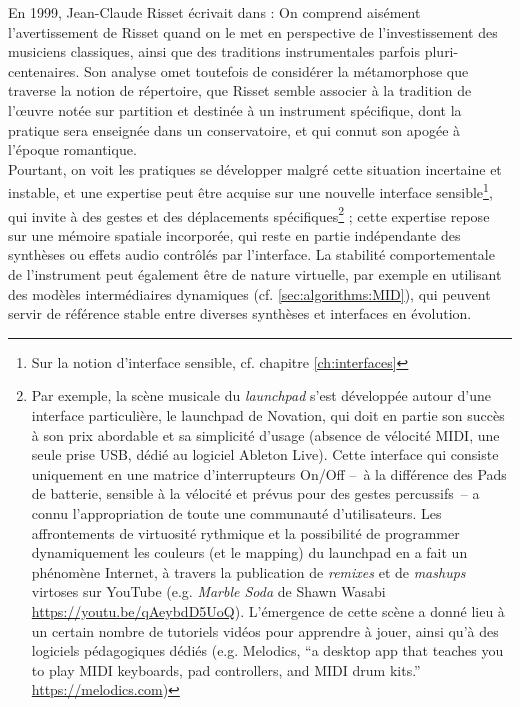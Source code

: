 \indent En 1999, Jean-Claude Risset écrivait dans \cite{genevois_les_1999} :  On comprend aisément l'avertissement de Risset quand on le met en perspective de l'investissement des musiciens classiques, ainsi que des traditions instrumentales parfois pluri-centenaires. Son analyse omet toutefois de considérer la métamorphose que traverse la notion de répertoire, que Risset semble associer à la tradition de l'œuvre notée sur partition et destinée à un instrument spécifique, dont la pratique sera enseignée dans un conservatoire, et qui connut son apogée à l'époque romantique.\\
\noindent Pourtant, on voit les pratiques se développer malgré cette situation incertaine et instable, et une expertise peut être acquise sur une nouvelle interface sensible\footnote{Sur la notion d'interface sensible, cf. chapitre \ref{ch:interfaces}}, qui invite à des gestes et des déplacements spécifiques\footnote{Par exemple, la scène musicale du \textit{launchpad} s'est développée autour d'une interface particulière, le launchpad de Novation, qui doit en partie son succès à son prix abordable et sa simplicité d'usage (absence de vélocité \gls{MIDI}, une seule prise \gls{USB}, dédié au logiciel Ableton Live). Cette interface qui consiste uniquement en une matrice d'interrupteurs On/Off --~à la différence des Pads de batterie, sensible à la vélocité et prévus pour des gestes percussifs~-- a connu l'appropriation de toute une communauté d'utilisateurs. Les affrontements de virtuosité rythmique et la possibilité de programmer dynamiquement les couleurs (et le mapping) du launchpad en a fait un phénomène Internet, à travers la publication de \textit{remixes} et de \textit{mashups} virtoses sur YouTube (e.g. \textit{Marble Soda} de Shawn Wasabi \url{https://youtu.be/qAeybdD5UoQ}). L'émergence de cette scène a donné lieu à un certain nombre de tutoriels vidéos pour apprendre à jouer, ainsi qu'à des logiciels pédagogiques dédiés (e.g. Melodics, ``a desktop app that teaches you to play MIDI keyboards, pad controllers, and MIDI drum kits.'' \url{https://melodics.com})} ; cette expertise repose sur une mémoire spatiale incorporée, qui reste en partie indépendante des synthèses ou effets audio contrôlés par l'interface. La stabilité comportementale de l'instrument peut également être de nature virtuelle, par exemple en utilisant des modèles intermédiaires dynamiques \cite{goudard_dynamic_2011} (cf. \ref{sec:algorithms:MID}), qui peuvent servir de référence stable entre diverses synthèses et interfaces en évolution.
